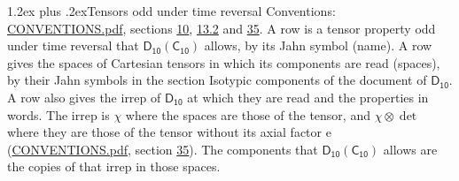 \documentclass[10pt,a4paper]{article}
\makeatletter
\renewcommand\section{\@startsection{section}{1}{\z@}{-3ex plus -1ex minus -.2ex}%
  {1.2ex plus .2ex}{\normalfont\large\sffamily\bfseries\color{parttitle}}}
\numberwithin{equation}{section}
\newcommand{\grp}[1]{\mathsf{#1}}
\newcommand{\irrprod}{\otimes}
\makeatother
\begin{document}
\section{Tensors odd under time reversal}\label{s:time_odd}
Conventions: \href{../../CONVENTIONS.pdf}{CONVENTIONS.pdf}, sections \href{../../../rotation/CONVENTIONS.pdf\#conv.10}{10}, \href{../../../rotation/CONVENTIONS.pdf\#conv.13.2}{13.2} and \href{../../CONVENTIONS.pdf\#conv.35}{35}.
\leavevmode\label{n:head.name.property}A row is a tensor property odd under time reversal that $\grp{D_{10}}(\grp{C_{10}})$ allows, by its Jahn symbol (name). \label{n:head.spaces}A row gives the spaces of Cartesian tensors in which its components are read (spaces), by their Jahn symbols in the section Isotypic components of the document of \href{../../../rotation/data/pdf/D10.pdf}{$\grp{D_{10}}$}. \label{n:head.properties}A row also gives the irrep of $\grp{D_{10}}$ at which they are read and the properties in words. The irrep is $\chi$ where the spaces are those of the tensor, and $\chi \irrprod \det$ where they are those of the tensor without its axial factor e (\href{../../CONVENTIONS.pdf}{CONVENTIONS.pdf}, section \href{../../CONVENTIONS.pdf\#conv.35}{35}). The components that $\grp{D_{10}}(\grp{C_{10}})$ allows are the copies of that irrep in those spaces.
\end{document}
